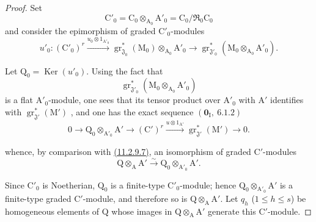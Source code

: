 \begin{proof}
Set
\[
  \mathrm{C}'_0=\mathrm{C}_0\otimes_{\mathrm{A}_0}\mathrm{A}'_0
  =\mathrm{C}_0/\mathfrak{R}_0\mathrm{C}_0
\]
and consider the epimorphism of graded $\mathrm{C}'_0$-modules
\[
  u'_0:(\mathrm{C}'_0)^r
  \xrightarrow{u_0\otimes 1_{\mathrm{A}'_0}}
  \operatorname{gr}^*_{\mathfrak{J}_0}(\mathrm{M}_0)\otimes_{\mathrm{A}_0}\mathrm{A}'_0
  \longrightarrow
  \operatorname{gr}^*_{\mathfrak{J}'_0}
  (\mathrm{M}_0\otimes_{\mathrm{A}_0}\mathrm{A}'_0).
\]

Let $\mathrm{Q}_0=\operatorname{Ker}(u'_0)$. Using the fact that
\[
  \operatorname{gr}^*_{\mathfrak{J}'_0}
  (\mathrm{M}_0\otimes_{\mathrm{A}_0}\mathrm{A}'_0)
\]
is a flat $\mathrm{A}'_0$-module, one sees that its tensor product over $\mathrm{A}'_0$ with $\mathrm{A}'$ identifies with $\operatorname{gr}^*_{\mathfrak{J}'}(\mathrm{M}')$ , and one has the exact sequence $(\mathbf{0}_\mathrm{I},~6.1.2)$
\begin{equation}
  0\longrightarrow\mathrm{Q}_0\otimes_{\mathrm{A}'_0}\mathrm{A}'
  \longrightarrow(\mathrm{C}')^r
  \xrightarrow{u\otimes 1_{\mathrm{A}'}}
  \operatorname{gr}^*_{\mathfrak{J}'}(\mathrm{M}')
  \longrightarrow 0.
  \label{IV.11.2.9.8}
\tag{11.2.9.8}
\end{equation}


whence, by comparison with {\hyperref[IV.11.2.9]{(11.2.9.7)}}, an isomorphism of graded $\mathrm{C}'$-modules
\[
  \mathrm{Q}\otimes_\mathrm{A}\mathrm{A}'
  \xrightarrow{\sim}
  \mathrm{Q}_0\otimes_{\mathrm{A}'_0}\mathrm{A}'.
\]

Since $\mathrm{C}'_0$ is Noetherian, $\mathrm{Q}_0$ is a finite-type $\mathrm{C}'_0$-module; hence $\mathrm{Q}_0\otimes_{\mathrm{A}'_0}\mathrm{A}'$ is a finite-type graded $\mathrm{C}'$-module, and therefore so is $\mathrm{Q}\otimes_\mathrm{A}\mathrm{A}'$. Let $q_h$ ($1\leqslant h\leqslant s$) be homogeneous elements of $\mathrm{Q}$ whose images in $\mathrm{Q}\otimes_\mathrm{A}\mathrm{A}'$ generate this $\mathrm{C}'$-module.


\end{proof}
